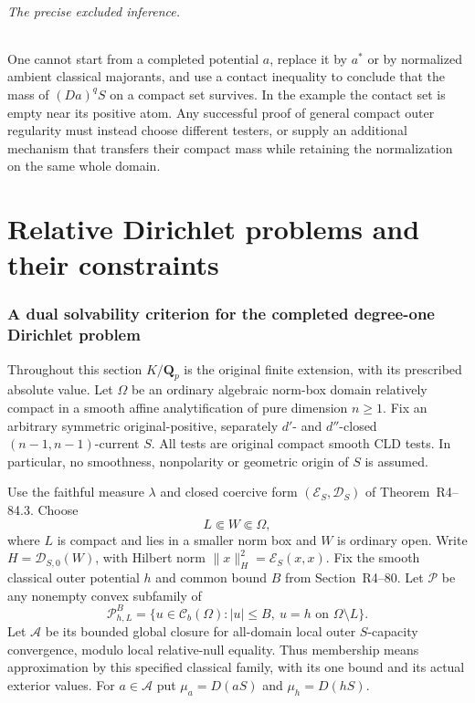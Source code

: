 \documentclass[11pt,a4paper]{article}
\numberwithin{equation}{section}
\theoremstyle{definition}
\theoremstyle{remark}
\begin{document}
\paragraph{The precise excluded inference.}
One cannot start from a completed potential $a$, replace it by $a^*$ or
by normalized ambient classical majorants, and use a contact inequality
to conclude that the mass of $(Da)^qS$ on a compact set survives. In the
example the contact set is empty near its positive atom. Any successful
proof of general compact outer regularity must instead choose different
testers, or supply an additional mechanism that transfers their compact
mass while retaining the normalization on the same whole domain.



\part{Relative Dirichlet problems and their constraints}

\section{A dual solvability criterion for the completed degree-one Dirichlet problem}
\label{sec:r6-dirichlet-energy-separation}

Throughout this section $K/\mathbf Q_p$ is the original finite extension,
with its prescribed absolute value. Let $\Omega$ be an ordinary algebraic
norm-box domain relatively compact in a smooth affine analytification of
pure dimension $n\ge1$. Fix an arbitrary symmetric original-positive,
separately $d'$- and $d''$-closed $(n-1,n-1)$-current $S$.
All tests are original compact smooth CLD tests. In particular, no
smoothness, nonpolarity or geometric origin of $S$ is assumed.

Use the faithful measure $\lambda$ and closed coercive form
$(\mathcal E_S,\mathscr D_S)$ of
Theorem~\textup{R4--84.3}. Choose
\[
       L\Subset W\Subset\Omega,
\]
where $L$ is compact and lies in a smaller norm box and $W$ is ordinary
open. Write $H=\mathscr D_{S,0}(W)$, with Hilbert norm
$\|x\|_H^2=\mathcal E_S(x,x)$.
Fix the smooth classical outer potential $h$ and common bound $B$ from
Section~\textup{R4--80}. Let $\mathscr P$ be any
nonempty convex subfamily of
\[
 \mathscr P_{h,L}^B
   =\{u\in\mathcal C_b(\Omega): |u|\le B,\ u=h
                                      \text{ on }\Omega\setminus L\}.
\]
Let $\mathscr A$ be its bounded global closure for all-domain local
outer $S$-capacity convergence, modulo local relative-null equality.
Thus membership means approximation by this specified classical family,
with its one bound and its actual exterior values. For $a\in\mathscr A$
put $\mu_a=D(aS)$ and $\mu_h=D(hS)$.
\end{document}
